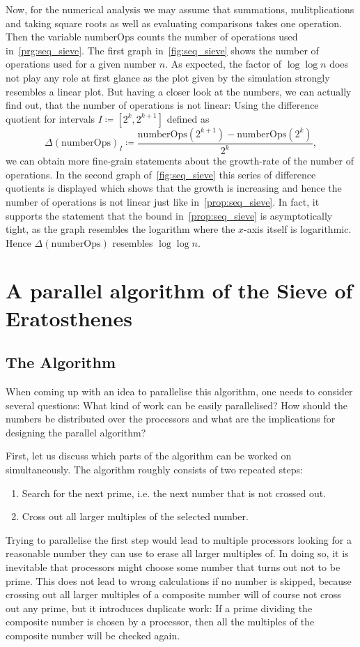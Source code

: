 \documentclass[a4paper,12pt]{article}
\begin{document}
Now, for the numerical analysis we may assume that summations, mulitplications and taking square roots as well as evaluating comparisons takes one operation.
Then the variable $\mathrm{numberOps}$ counts the number of operations used in~\autoref{prg:seq_sieve}.
The first graph in~\autoref{fig:seq_sieve} shows the number of operations used for a given number $n$.
As expected, the factor of $\log\log n$ does not play any role at first glance as the plot given by the simulation strongly resembles a linear plot.
But having a closer look at the numbers, we can actually find out, that the number of operations is not linear:
Using the difference quotient for intervals $I\coloneqq [2^k, 2^{k+1}]$ defined as
\[\Delta(\mathrm{numberOps})_I\coloneqq \frac{\mathrm{numberOps}(2^{k+1}) - \mathrm{numberOps}(2^{k})}{2^k},\]
we can obtain more fine-grain statements about the growth-rate of the number of operations.
In the second graph of~\autoref{fig:seq_sieve} this series of difference quotients is displayed which shows that the growth is increasing and hence the number of operations is not linear just like in~\autoref{prop:seq_sieve}.
In fact, it supports the statement that the bound in~\autoref{prop:seq_sieve} is asymptotically tight, as the graph resembles the logarithm where the $x$-axis itself is logarithmic.
Hence $\Delta(\mathrm{numberOps})$ resembles $\log\log n$.


\section{A parallel algorithm of the Sieve of Eratosthenes}

\subsection{The Algorithm}

When coming up with an idea to parallelise this algorithm, one needs to consider several questions:
What kind of work can be easily parallelised?
How should the numbers be distributed over the processors and what are the implications for designing the parallel algorithm?

First, let us discuss which parts of the algorithm can be worked on simultaneously.
The algorithm roughly consists of two repeated steps:
\begin{enumerate}
	\item Search for the next prime, i.e. the next number that is not crossed out.
	\item Cross out all larger multiples of the selected number.
\end{enumerate}
Trying to parallelise the first step would lead to multiple processors looking for a reasonable number they can use to erase all larger multiples of.
In doing so, it is inevitable that processors might choose some number that turns out not to be prime.
This does not lead to wrong calculations if no number is skipped, because crossing out all larger multiples of a composite number will of course not cross out any prime, but it introduces duplicate work:
If a prime dividing the composite number is chosen by a processor, then all the multiples of the composite number will be checked again.
\end{document}
